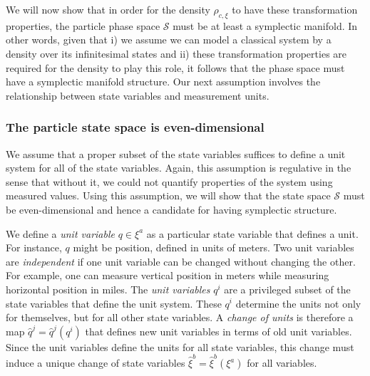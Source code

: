 \documentclass[12pt, english, twoside]{article} %
\begin{document}
We will now show that in order for the density $\rho_{c, \xi}$ to have these transformation properties, the particle phase space $\mathcal{S}$ must be at least a symplectic manifold. In other words, given that i) we assume we can model a classical system by a density over its infinitesimal states and ii) these transformation properties are required for the density to play this role, it follows that the phase space must have a symplectic manifold structure. Our next assumption involves the relationship between state variables and measurement units. 

\subsubsection{The particle state space is even-dimensional}

We assume that a proper subset of the state variables suffices to define a unit system for all of the state variables. Again, this assumption is regulative in the sense that without it, we could not quantify properties of the system using measured values. Using this assumption, we will show that the state space $\mathcal{S}$ must be even-dimensional and hence a candidate for having symplectic structure. 

We define a \textit{unit variable} $q \in \xi^a$ as a particular state variable that defines a unit. For instance, $q$ might be position, defined in units of meters. Two unit variables are \textit{independent} if one unit variable can be changed without changing the other. For example, one can measure vertical position in meters while measuring horizontal position in miles.  The \textit{unit variables} $q^i$ are a privileged subset of the state variables that define the unit system. These $q^i$ determine the units not only for themselves, but for all other state variables. A \textit{change of units} is therefore a map $\hat{q}^j = \hat{q}^j(q^i)$ that defines new unit variables in terms of old unit variables. Since the unit variables define the units for all state variables, this change must induce a unique change of state variables $\hat{\xi}^b = \hat{\xi}^b(\xi^a)$ for all variables.
\end{document}
